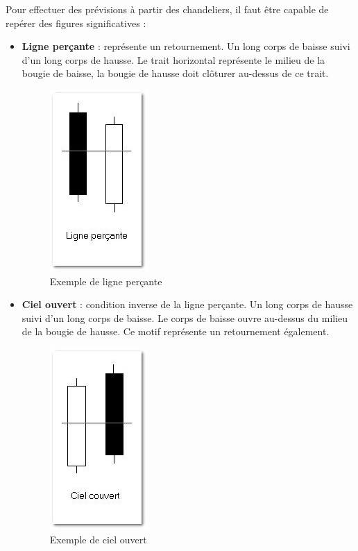 Pour effectuer des prévisions à partir des chandeliers, il faut être capable de repérer des figures significatives : 
\begin{itemize}
\item  \textbf{Ligne perçante} : représente un retournement. Un long corps de baisse suivi d’un long corps de hausse. Le trait horizontal représente le milieu de la bougie de baisse, la bougie de hausse doit clôturer au-dessus de ce trait.  
\begin{figure}[H]
  \center
  \includegraphics[scale=0.5]{../graph/chandelier1.png}
  \caption{Exemple de ligne perçante}
\end{figure} 

\item \textbf{Ciel ouvert} : condition inverse de la ligne perçante. Un long corps de hausse suivi d’un long corps de baisse. Le corps de baisse ouvre au-dessus du milieu de la bougie de hausse. Ce motif représente un retournement également. 
\begin{figure}[H]
  \center
  \includegraphics[scale=0.5]{../graph/chandelier2.png}
  \caption{Exemple de ciel ouvert}
\end{figure} 


\end{itemize}
